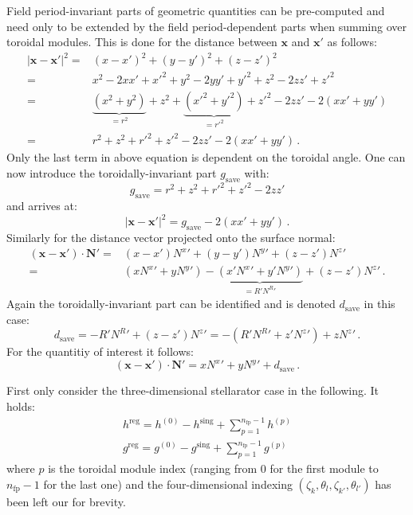 Field period-invariant parts of geometric quantities can be pre-computed and need only to be extended by
the field period-dependent parts when summing over toroidal modules.
This is done for the distance between $\mathbf{x}$ and $\mathbf{x}'$ as follows:
\begin{align}
     |\mathbf{x} - \mathbf{x}'|^2
  =& (x-x')^2 + (y-y')^2 + (z-z')^2 \nonumber \\
  =& x^2 - 2 x x' + {x'}^2  +  y^2 - 2 y y' + {y'}^2  +  z^2 - 2 z z' + {z'}^2 \nonumber \\
  =& \underbrace{(x^2 + y^2)}_{=r^2} + z^2 + \underbrace{({x'}^2 + {y'}^2)}_{={r'}^2} + {z'}^2 - 2 z z' - 2(x x' + y y') \nonumber \\
  =& r^2 + z^2 + {r'}^2 + {z'}^2 - 2 z z' - 2(x x' + y y') \, .
\end{align}
Only the last term in above equation is dependent on the toroidal angle.
One can now introduce the toroidally-invariant part $g_\mathrm{save}$ with:
\begin{equation}
  g_\mathrm{save} = r^2 + z^2 + {r'}^2 + {z'}^2 - 2 z z' \label{eqn:gsave}
\end{equation}
and arrives at:
\begin{equation}
  |\mathbf{x} - \mathbf{x}'|^2 = g_\mathrm{save}- 2(x x' + y y') \, .
\end{equation}
Similarly for the distance vector projected onto the surface normal:
\begin{align}
     (\mathbf{x} - \mathbf{x}') \cdot \mathbf{N}'
  =& (x-x') {N^x}' + (y-y') {N^y}' + (z-z') {N^z}' \nonumber \\
  =& \left( x {N^x}' + y {N^y}' \right) - \underbrace{\left( x' {N^x}' + y' {N^y}' \right)}_{=R' {N^R}'} + (z-z') {N^z}' \, .
\end{align}
Again the toroidally-invariant part can be identified and is denoted $d_\mathrm{save}$ in this case:
\begin{equation}
    d_\mathrm{save}
  = -R' {N^R}' + (z-z') {N^z}'
  = - \left(R' {N^R}' + z' {N^z}' \right) + z {N^z}' \label{eqn:dsave} \, .
\end{equation}
For the quantitiy of interest it follows:
\begin{equation}
  (\mathbf{x} - \mathbf{x}') \cdot \mathbf{N}' = x {N^x}' + y {N^y}' + d_\mathrm{save} \, .
\end{equation}

First only consider the three-dimensional stellarator case
in the following.
It holds:
\begin{align}
 h^\textrm{reg} = h^{(0)} - h^\textrm{sing} + \sum\limits_{p=1}^{n_\textrm{fp}-1} h^{(p)} \\
 g^\textrm{reg} = g^{(0)} - g^\textrm{sing} + \sum\limits_{p=1}^{n_\textrm{fp}-1} g^{(p)}
\end{align}
where $p$ is the toroidal module index (ranging from 0 for the first module to $n_\textrm{fp}-1$ for the last one)
and the four-dimensional indexing $(\zeta_k, \theta_l, \zeta_{k'}, \theta_{l'})$ has been left our for brevity.


